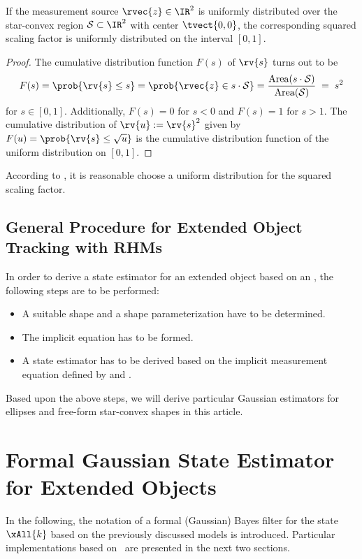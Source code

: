 \documentclass[preprint,1p,11pt]{ISAS_IR}
\begin{document}
 \begin{Theorem}\label{theo:uniform} 
If  the   measurement source $\rvec{z} \in \IR^2$ is uniformly distributed over the    star-convex region $\mathcal{S} \subset \IR^2 $ with center $\tvect{0,0}$, the corresponding squared scaling factor 
  is uniformly distributed on the interval $[0,1]$.
 \end{Theorem}
 \begin{proof}
The cumulative  distribution function $F(s)$ of $\rv{s}$ turns out  to be
\begin{equation}
 F(s) = \prob{\rv{s} \leq s}  =  \prob{\rvec{z} \in  s \cdot \mathcal{S} }   =    \frac{\text{Area}( s \cdot \mathcal{S})}{\text{Area}(\mathcal{S}) }\;=\;s^2   
\end{equation}
for $s \in [0,1]$. Additionally,    $F(s) = 0$ for $s< 0 $ and $F(s)=1$ for $s>1$. The cumulative distribution of  $\rv{u}:=\rv{s}^2$ given by $F(u)=\prob{\rv{s} \leq \sqrt{u}}$    is the cumulative  distribution function of the uniform distribution on $[0,1]$.
\end{proof}
According to , it is reasonable choose a uniform distribution for the squared scaling factor.

\section{General Procedure for Extended Object Tracking with RHMs}\label{sec:general}
In order to derive a state estimator for an extended object based on an \rhm , the following steps are to be performed:
\begin{itemize}
 \item A suitable shape and a shape parameterization have to be determined.
  \item The implicit equation  has to be formed. 
   \item  A  state estimator has to be derived based on the implicit measurement equation defined by   and .
\end{itemize}
Based upon the above steps, we will derive  particular Gaussian estimators for ellipses and free-form star-convex shapes in this article.


\chapter{Formal Gaussian State Estimator  for Extended Objects}\label{sec:bayes_est}
In the following, the notation of a formal (Gaussian) Bayes filter for   the state $\xAll{k}$ based on the previously discussed models is introduced. Particular implementations  based on \rhms\ are presented in the next two sections.
\end{document}
